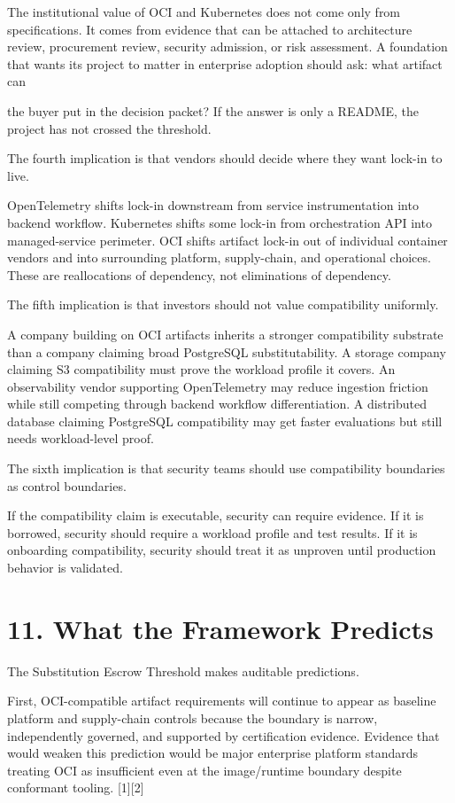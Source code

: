 \documentclass[11pt]{article}
\begin{document}
The institutional value of OCI and Kubernetes does not come only from specifications. It comes from evidence that can be attached to architecture review, procurement review, security admission, or risk assessment. A foundation that wants its project to matter in enterprise adoption should ask: what artifact can

the buyer put in the decision packet? If the answer is only a README, the project has not crossed the threshold.

The fourth implication is that vendors should decide where they want lock-in to live.

OpenTelemetry shifts lock-in downstream from service instrumentation into backend workflow. Kubernetes shifts some lock-in from orchestration API into managed-service perimeter. OCI shifts artifact lock-in out of individual container vendors and into surrounding platform, supply-chain, and operational choices. These are reallocations of dependency, not eliminations of dependency.

The fifth implication is that investors should not value compatibility uniformly.

A company building on OCI artifacts inherits a stronger compatibility substrate than a company claiming broad PostgreSQL substitutability. A storage company claiming S3 compatibility must prove the workload profile it covers. An observability vendor supporting OpenTelemetry may reduce ingestion friction while still competing through backend workflow differentiation. A distributed database claiming PostgreSQL compatibility may get faster evaluations but still needs workload-level proof.

The sixth implication is that security teams should use compatibility boundaries as control boundaries.

If the compatibility claim is executable, security can require evidence. If it is borrowed, security should require a workload profile and test results. If it is onboarding compatibility, security should treat it as unproven until production behavior is validated.

\section{11. What the Framework Predicts}\label{what-the-framework-predicts}

The Substitution Escrow Threshold makes auditable predictions.

First, OCI-compatible artifact requirements will continue to appear as baseline platform and supply-chain controls because the boundary is narrow, independently governed, and supported by certification evidence. Evidence that would weaken this prediction would be major enterprise platform standards treating OCI as insufficient even at the image/runtime boundary despite conformant tooling. {[}1{]}{[}2{]}
\end{document}

